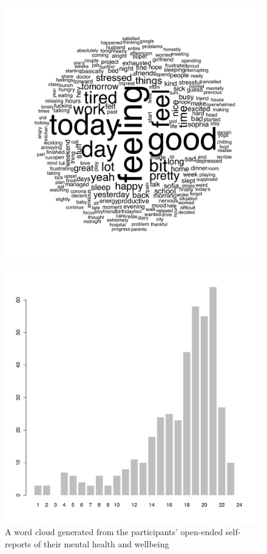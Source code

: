             \begin{figure}[h]
                \begin{minipage}{.48\textwidth}
                    \centering
                    \includegraphics[clip, trim=2cm 2cm 2cm 1cm, width=\textwidth]{figures/word-cloud.pdf}
                    \caption{A word cloud generated from the participants' open-ended self-reports of their mental health and wellbeing}
                    \label{fig:word-cloud}
                \end{minipage}
                \hfill
                \begin{minipage}{.48\textwidth}
                    \centering
                    \includegraphics[trim=0cm 0cm 2cm 0cm, width=\textwidth]{figures/time_frequency.pdf}

\end{minipage}
\end{figure}
